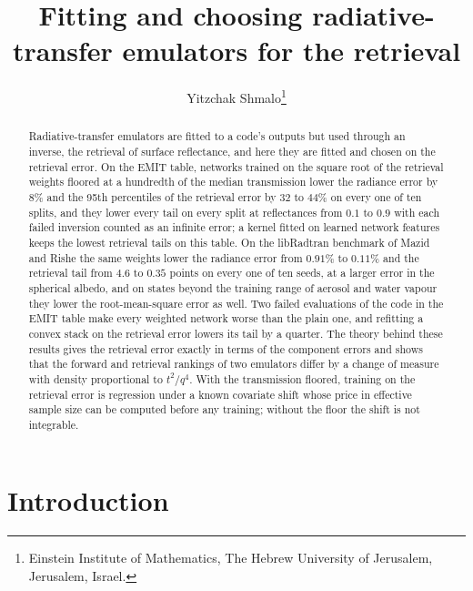 \documentclass[11pt]{article}
\title{Fitting and choosing radiative-transfer emulators for the retrieval}
\author{Yitzchak Shmalo\thanks{Einstein Institute of Mathematics, The Hebrew University of Jerusalem, Jerusalem,
Israel.}}
\date{}
\theoremstyle{remark}
\newcommand{\1}{\mathbf{1}}
\begin{document}
\maketitle

\begin{abstract}
Radiative-transfer emulators are fitted to a code's outputs but used through an inverse, the retrieval of surface
reflectance, and here they are fitted and chosen on the retrieval error. On the EMIT table, networks trained on the
square root of the retrieval weights floored at a hundredth of the median transmission lower the radiance error by
$8\%$ and the 95th percentiles of the retrieval error by $32$ to $44\%$ on every one of ten splits, and they lower
every tail on every split at reflectances from $0.1$ to $0.9$ with each failed inversion counted as an infinite error;
a kernel fitted on learned network features keeps the lowest retrieval tails on this table. On the libRadtran
benchmark of Mazid and Rishe the same weights lower the radiance error from $0.91\%$ to $0.11\%$ and the retrieval tail
from $4.6$ to $0.35$ points on every one of ten seeds, at a larger error in the spherical albedo, and on states beyond
the training range of aerosol and water vapour they lower the root-mean-square error as well. Two failed evaluations of
the code in the EMIT table make every weighted network worse than the plain one, and refitting a convex stack on the
retrieval error lowers its tail by a quarter. The theory behind these results gives the retrieval error exactly in
terms of the component errors and shows that the forward and retrieval rankings of two emulators differ by a change of
measure with density proportional to $t^2/q^4$. With the transmission floored, training on the retrieval error is
regression under a known covariate shift whose price in effective sample size can be computed before any training;
without the floor the shift is not integrable.
\end{abstract}

\section{Introduction}
\end{document}
